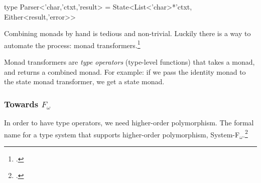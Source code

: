  \begin{code}[language=Caml]
  type Parser<'char,'ctxt,'result> =
    State<List<'char>*'ctxt,
          Either<result,'error>>
  \end{code}

  Combining monads by hand is tedious and non-trivial.
  Luckily there is a way to automate the process: monad transformers.\footcite[Chapter~18]{Haskell}

  Monad transformers are \textit{type operators} (type-level functions) that takes a monad, and returns a combined monad.
  For example: if we pass the identity monad to the state monad transformer, we get a state monad.

  \subsubsection*{Towards $F_\omega$}
  In order to have type operators, we need higher-order polymorphism.
  The formal name for a type system that supports higher-order polymorphism, System-F$_\omega$.\footcite[Chapter~30]{Pierce02}
  
  
